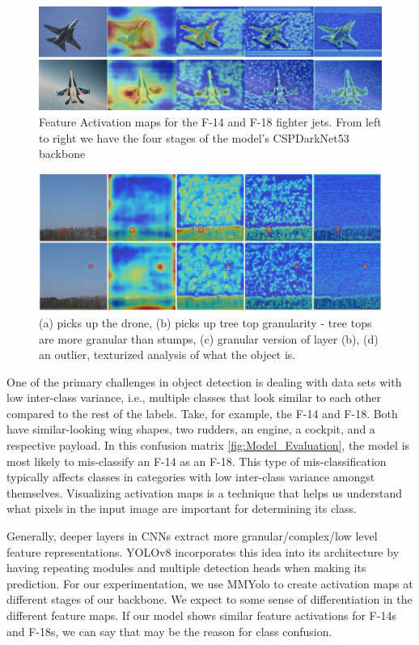 \documentclass[10pt,twocolumn,letterpaper]{article}
\begin{document}
\begin{figure}[h]
    \centering
    \includegraphics[width=1.0\textwidth]{figures/F14vsF18.png}
    \caption{Feature Activation maps for the F-14 and F-18 fighter jets. From left to right we have the four stages of the model’s
CSPDarkNet53 backbone}
    \label{fig:F14vsF18}
\end{figure}
\begin{figure}[h]
    \centering
    \includegraphics[width=1.0\textwidth]{figures/drone_gradcam.png}
    \caption{(a) picks up the drone, (b) picks up tree top granularity - tree tops are more granular than stumps, (c) granular version of layer (b), (d) an outlier, texturized analysis of what the object is.}
    \label{fig:drone_gradcam}
\end{figure}

One of the primary challenges in object detection is dealing with data sets with low inter-class variance, i.e., multiple classes that look similar to each other compared to the rest of the labels. Take, for example, the F-14 and F-18. Both have similar-looking wing shapes, two rudders, an engine, a cockpit, and a respective payload. In this confusion matrix \ref{fig:Model_Evaluation}, the model is most likely to mis-classify an F-14 as an F-18. This type of mis-classification typically affects classes in categories with low inter-class variance amongst themselves. Visualizing activation maps \cite{MMYOLOViz} is a technique that helps us understand what pixels in the input image are important for determining its class. 

Generally, deeper layers in CNNs extract more granular/complex/low level feature representations. YOLOv8 incorporates this idea into its architecture by having repeating modules and multiple detection heads when making its prediction. For our experimentation, we use MMYolo \cite{MMYOLOViz} to create activation maps at different stages of our backbone. We expect to some sense of differentiation in the different feature maps. If our model shows similar feature activations for F-14s and F-18s, we can say that may be the reason for class confusion.
\end{document}
